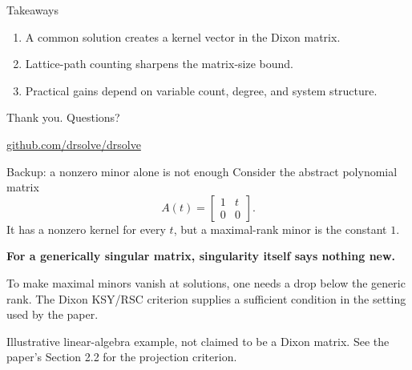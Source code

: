 \documentclass[aspectratio=169,11pt,professionalfonts]{beamer}
\newcommand{\src}[1]{\vfill{\color{Muted}\fontsize{7}{8.5}\selectfont #1\par}}
\newcommand{\gap}{\par\vspace{3mm}}
\begin{document}
\begin{frame}{Takeaways}
\vspace{3mm}\begin{enumerate}\setlength{\itemsep}{5mm}
\item A common solution creates a kernel vector in the Dixon matrix.
\item Lattice-path counting sharpens the matrix-size bound.
\item Practical gains depend on variable count, degree, and system structure.
\end{enumerate}\vspace{6mm}
{\color{Teal}\Large Thank you. Questions?}\gap
\href{https://github.com/drsolve/drsolve}{github.com/drsolve/drsolve}
\end{frame}

\appendix
\begin{frame}{Backup: a nonzero minor alone is not enough}
Consider the abstract polynomial matrix
\[A(t)=\begin{bmatrix}1&t\\0&0\end{bmatrix}.\]
It has a nonzero kernel for every $t$, but a maximal-rank minor is the constant $1$.
\gap\textbf{For a generically singular matrix, singularity itself says nothing new.}\gap
To make maximal minors vanish at solutions, one needs a drop below the generic rank. The Dixon KSY/RSC criterion supplies a sufficient condition in the setting used by the paper.
\src{Illustrative linear-algebra example, not claimed to be a Dixon matrix. See the paper's Section 2.2 for the projection criterion.}
\end{frame}
\end{document}
